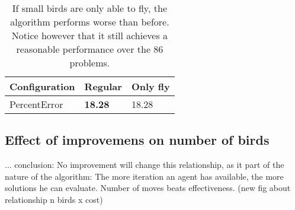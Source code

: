 \begin{table}[h!]
\centering
\begin{tabular}{ |p{2.5cm}||p{0.75cm}|p{0.75cm}|  }
 \hline
 Configuration& Regular & Only fly\\
 \hline \hline
PercentError & \textbf{18.28} & 18.28\\
\hline
\end{tabular}
\caption{If small birds are only able to fly, the algorithm performs worse than before. Notice however that it still achieves a reasonable performance over the 86 problems.}
\label{small_birds_only_fly}
\end{table}

\subsection{Effect of improvemens on number of birds} \label{Effect of improvemens on number of birds}

... conclusion: No improvement will change this relationship, as it part of the nature of the algorithm: The more iteration an agent has available, the more solutions he can evaluate. Number of moves beats effectiveness. (new fig about relationship n birds x cost)